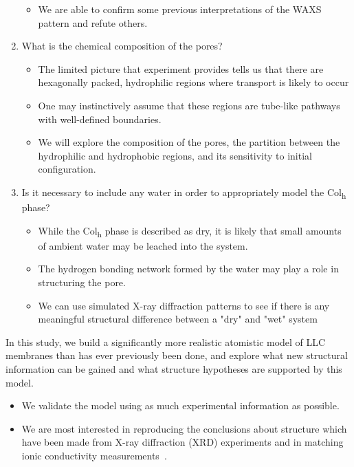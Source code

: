 \documentclass{article}
\begin{document}
\begin{enumerate}
\begin{itemize}
		\item We are able to confirm some previous interpretations of the WAXS pattern and refute others.  
	\end{itemize}
	\item What is the chemical composition of the pores?\label{point:composition}
	\begin{itemize}
		\item The limited picture that experiment provides tells us that there are
        hexagonally packed, hydrophilic regions where transport is likely to occur
		\item One may instinctively assume that these regions are tube-like pathways with 
		well-defined boundaries.
		\item We will explore the composition of the pores, the partition
		between the hydrophilic and hydrophobic regions, and its sensitivity to initial
		configuration. 
	\end{itemize}
    \item Is it necessary to include any water in order to appropriately model the 
    Col\textsubscript{h} phase? \label{point:water}
    \begin{itemize}
		\item While the Col\textsubscript{h} phase is described as dry, it is likely that small 
		amounts of ambient water may be leached into the system.
		\item The hydrogen bonding network formed by the water may play a role in structuring the
		pore.
		\item We can use simulated X-ray diffraction patterns to see if there is any meaningful 
		structural difference between a "dry" and "wet" system
    \end{itemize}
  \end{enumerate}

  In this study, we build a significantly more realistic atomistic model of LLC membranes
  than has ever previously been done, and explore what new structural information can be gained
  and what structure hypotheses are supported by this model.

  \begin{itemize}
    \item We validate the model using as much experimental information as possible.
    \item We are most interested in reproducing the conclusions about structure
    which have been made from X-ray diffraction (XRD) experiments and in matching ionic
    conductivity measurements~\cite{feng_thin_2016}.
  \end{itemize}
\end{document}
